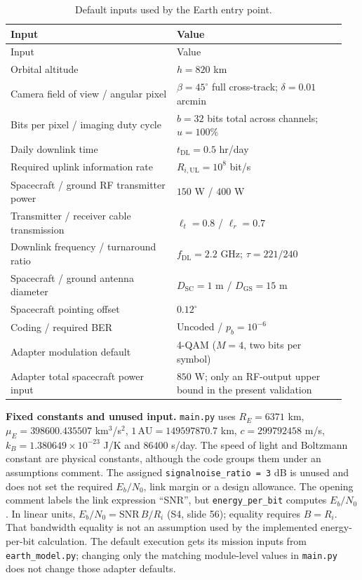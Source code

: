 \documentclass[10pt,a4paper]{article}
\newcommand{\code}[1]{\nolinkurl{#1}}
\begin{document}
\small
\begin{longtable}{@{}P{0.47\linewidth}P{0.48\linewidth}@{}}
\caption{Default inputs used by the Earth entry point.}\\
\toprule
Input & Value \\
\midrule
\endfirsthead
\toprule
Input & Value \\
\midrule
\endhead
\bottomrule
\endlastfoot
Orbital altitude & $h=820$ km \\
Camera field of view / angular pixel & $\beta=45^\circ$ full cross-track;
$\delta=0.01$ arcmin \\
Bits per pixel / imaging duty cycle & $b=32$ bits total across channels;
$u=100\%$ \\
Daily downlink time & $t_{\mathrm{DL}}=0.5$ hr/day \\
Required uplink information rate & $R_{i,\mathrm{UL}}=10^8$ bit/s \\
Spacecraft / ground RF transmitter power & $150$ W / $400$ W \\
Transmitter / receiver cable transmission & $\ell_t=0.8$ / $\ell_r=0.7$ \\
Downlink frequency / turnaround ratio & $f_{\mathrm{DL}}=2.2$ GHz;
$\tau=221/240$ \\
Spacecraft / ground antenna diameter & $D_{\mathrm{SC}}=1$ m /
$D_{\mathrm{GS}}=15$ m \\
Spacecraft pointing offset & $0.12^\circ$ \\
Coding / required BER & Uncoded / $p_b=10^{-6}$ \\
Adapter modulation default & 4-QAM ($M=4$, two bits per symbol) \\
Adapter total spacecraft power input & $850$ W; only an RF-output upper bound
in the present validation \\
\end{longtable}

\normalsize
\textbf{Fixed constants and unused input.}
\code{main.py} uses $R_E=6371$ km,
$\mu_E=398600.435507$ km$^3$/s$^2$, $1\,\mathrm{AU}=149597870.7$ km,
$c=299792458$ m/s, $k_B=1.380649\times10^{-23}$ J/K and
$86400$ s/day. The speed of light and Boltzmann constant are physical
constants, although the code groups them under an assumptions comment.
The assigned \code{signalnoise_ratio = 3} dB is unused and does not set the
required $E_b/N_0$, link margin or a design allowance.
The opening comment labels the link expression ``SNR'', but
\code{energy_per_bit} computes $E_b/N_0$. In linear units,
$E_b/N_0=\mathrm{SNR}\,B/R_i$ (S4, slide 56); equality requires $B=R_i$.
That bandwidth equality is not an assumption used by the implemented
energy-per-bit calculation.
The default execution gets its mission inputs from \code{earth_model.py};
changing only the matching module-level values in \code{main.py} does not
change those adapter defaults.
\end{document}
